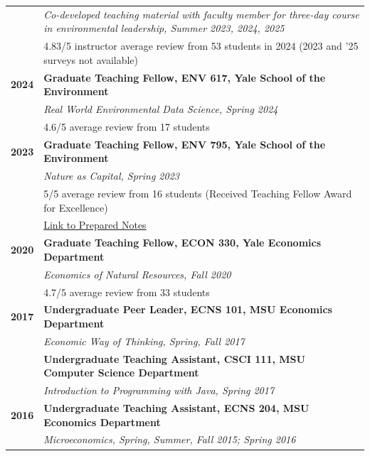 \documentclass[11pt]{article}
\begin{document}
\begin{longtable}{>{\bfseries}r p{5.5in}}
    & \textit{Co-developed teaching material with faculty member for three-day course in environmental leadership, Summer 2023, 2024, 2025} \\
    & 4.83/5 instructor average review from 53 students in 2024 (2023 and '25 surveys not available) \\[1ex]
2024 & \textbf{Graduate Teaching Fellow, ENV 617, Yale School of the Environment} \\
    & \textit{Real World Environmental Data Science, Spring 2024} \\
    & 4.6/5 average review from 17 students \\[1ex]
2023 & \textbf{Graduate Teaching Fellow, ENV 795, Yale School of the Environment} \\
    & \textit{Nature as Capital, Spring 2023} \\
    & 5/5 average review from 16 students (Received Teaching Fellow Award for Excellence)\\
    & \href{https://github.com/a5creel/nature_as_capital}{Link to Prepared Notes} \\[1ex]
2020 & \textbf{Graduate Teaching Fellow, ECON 330, Yale Economics Department} \\
    & \textit{Economics of Natural Resources, Fall 2020} \\
    & 4.7/5 average review from 33 students \\[1ex]
2017 & \textbf{Undergraduate Peer Leader, ECNS 101, MSU Economics Department} \\
    & \textit{Economic Way of Thinking, Spring, Fall 2017} \\[1ex]
    & \textbf{Undergraduate Teaching Assistant, CSCI 111, MSU Computer Science Department} \\
    & \textit{Introduction to Programming with Java, Spring 2017} \\[1ex]
2016 & \textbf{Undergraduate Teaching Assistant, ECNS 204, MSU Economics Department} \\
    & \textit{Microeconomics, Spring, Summer, Fall 2015; Spring 2016} \\
\end{longtable}
\end{document}
